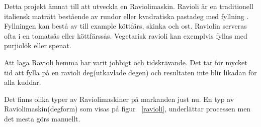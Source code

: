 Detta projekt ämnat till att utveckla en Raviolimaskin. Ravioli är en traditionell italiensk maträtt bestående av rundor eller kvadratiska pastadeg med fyllning \cite{engproc}. Fyllningen kan bestå av till example köttfärs, skinka och ost. Raviolin serveras ofta i en tomatsås eller köttfärssås. Vegetarisk ravioli kan exemplvis fyllas med purjiolök eller spenat.\medskip

Att laga Ravioli hemma har varit jobbigt och tidskrävande. Det tar för mycket tid att fylla på en ravioli deg(utkavlade degen) och resultaten inte blir likadan för alla kuddar.\medskip

Det finns olika typer av Raviolimaskiner på markanden just nu. En typ av Raviolimaskin(degform) som visas på figur ~\ref{ravioli}, underlättar processen men det mesta görs manuellt.\medskip

